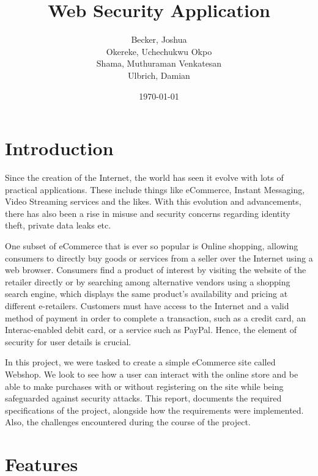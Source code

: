 \documentclass[12pt,a4paper]{article}
\begin{document}
	
	\title{Web Security Application}
	\author{Becker, Joshua\\ Okereke, Uchechukwu Okpo\\ Shama, Muthuraman Venkatesan\\ Ulbrich, Damian}
	\date{\today}
	\maketitle
	\clearpage
	
	
	\tableofcontents
	\clearpage
	
	\section{Introduction}
	
	
	\begin{flushleft}
	Since the creation of the Internet, the world has seen it evolve with lots of practical applications. These include things like eCommerce, Instant Messaging, Video Streaming services and the likes. With this evolution and advancements, there has also been a rise in misuse and security concerns regarding identity theft, private data leaks etc.
	
		
	One subset of eCommerce that is ever so popular is Online shopping, allowing consumers to directly buy goods or services from a seller over the Internet using a web browser. Consumers find a product of interest by visiting the website of the retailer directly or by searching among alternative vendors using a shopping search engine, which displays the same product's availability and pricing at different e-retailers. Customers must have access to the Internet and a valid method of payment in order to complete a transaction, such as a credit card, an Interac-enabled debit card, or a service such as PayPal. Hence, the element of security for user details is crucial.
	
	
	In this project, we were tasked to create a simple eCommerce site called Webshop. We look to see how a user can interact with the online store and be able to make purchases with or without registering on the site while being safeguarded against security attacks. This report, documents the required specifications of the project, alongside how the requirements were implemented. Also, the challenges encountered during the course of the project.
	
	
	\section{Features}

\end{flushleft}
\end{document}
